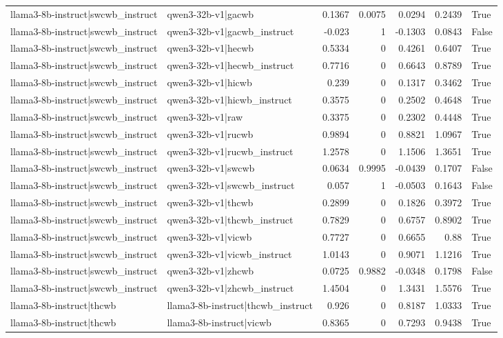 \begin{table}
\begin{tabular}{l l r r r r l}
llama3-8b-instruct|swcwb_instruct & qwen3-32b-v1|gacwb & 0.1367 & 0.0075 & 0.0294 & 0.2439 & True \\
llama3-8b-instruct|swcwb_instruct & qwen3-32b-v1|gacwb_instruct & -0.023 & 1 & -0.1303 & 0.0843 & False \\
llama3-8b-instruct|swcwb_instruct & qwen3-32b-v1|hecwb & 0.5334 & 0 & 0.4261 & 0.6407 & True \\
llama3-8b-instruct|swcwb_instruct & qwen3-32b-v1|hecwb_instruct & 0.7716 & 0 & 0.6643 & 0.8789 & True \\
llama3-8b-instruct|swcwb_instruct & qwen3-32b-v1|hicwb & 0.239 & 0 & 0.1317 & 0.3462 & True \\
llama3-8b-instruct|swcwb_instruct & qwen3-32b-v1|hicwb_instruct & 0.3575 & 0 & 0.2502 & 0.4648 & True \\
llama3-8b-instruct|swcwb_instruct & qwen3-32b-v1|raw & 0.3375 & 0 & 0.2302 & 0.4448 & True \\
llama3-8b-instruct|swcwb_instruct & qwen3-32b-v1|rucwb & 0.9894 & 0 & 0.8821 & 1.0967 & True \\
llama3-8b-instruct|swcwb_instruct & qwen3-32b-v1|rucwb_instruct & 1.2578 & 0 & 1.1506 & 1.3651 & True \\
llama3-8b-instruct|swcwb_instruct & qwen3-32b-v1|swcwb & 0.0634 & 0.9995 & -0.0439 & 0.1707 & False \\
llama3-8b-instruct|swcwb_instruct & qwen3-32b-v1|swcwb_instruct & 0.057 & 1 & -0.0503 & 0.1643 & False \\
llama3-8b-instruct|swcwb_instruct & qwen3-32b-v1|thcwb & 0.2899 & 0 & 0.1826 & 0.3972 & True \\
llama3-8b-instruct|swcwb_instruct & qwen3-32b-v1|thcwb_instruct & 0.7829 & 0 & 0.6757 & 0.8902 & True \\
llama3-8b-instruct|swcwb_instruct & qwen3-32b-v1|vicwb & 0.7727 & 0 & 0.6655 & 0.88 & True \\
llama3-8b-instruct|swcwb_instruct & qwen3-32b-v1|vicwb_instruct & 1.0143 & 0 & 0.9071 & 1.1216 & True \\
llama3-8b-instruct|swcwb_instruct & qwen3-32b-v1|zhcwb & 0.0725 & 0.9882 & -0.0348 & 0.1798 & False \\
llama3-8b-instruct|swcwb_instruct & qwen3-32b-v1|zhcwb_instruct & 1.4504 & 0 & 1.3431 & 1.5576 & True \\
llama3-8b-instruct|thcwb & llama3-8b-instruct|thcwb_instruct & 0.926 & 0 & 0.8187 & 1.0333 & True \\
llama3-8b-instruct|thcwb & llama3-8b-instruct|vicwb & 0.8365 & 0 & 0.7293 & 0.9438 & True \\

\end{tabular}
\end{table}
